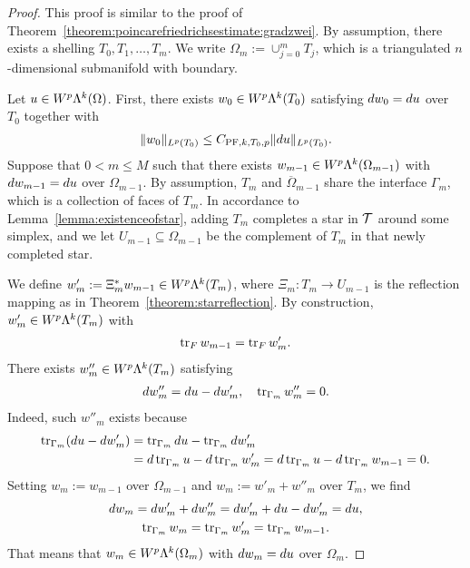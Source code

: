 \documentclass[10pt,letterpaper]{article}
\begin{document}
\begin{proof}
    This proof is similar to the proof of Theorem~\ref{theorem:poincarefriedrichsestimate:gradzwei}.
    By assumption, there exists a shelling $T_0, T_1, \dots, T_m$. 
    We write $\Omega_m := \cup_{j=0}^{m} T_j$, which is a triangulated $n$-dimensional submanifold with boundary.

    Let $u \in W^{p}\Lambda^{k}(\Omega)$. 
    First, there exists $w_0 \in W^{p}\Lambda^{k}(T_{0})$ satisfying $d w_0 = d u$ over $T_{0}$ together with 
    \begin{gather*}
        \| w_0 \|_{L^{p}(T_{0})} \leq C_{{\rm{PF}},k,T_{0},p} \| d u \|_{L^{p}(T_{0})}.
    \end{gather*}
    Suppose that $0 < m \leq M$ such that there exists $w_{m-1} \in W^{p}\Lambda^{k}(\Omega_{m-1})$ 
    with $d w_{m-1} = d u$ over $\Omega_{m-1}$. 
    By assumption, $T_{m}$ and $\overline\Omega_{m-1}$ share the interface $\Gamma_{m}$, which is a collection of faces of $T_{m}$. 
    In accordance to Lemma~\ref{lemma:existenceofstar}, adding $T_{m}$ completes a star in ${\mathcal T}$ around some simplex, and we let $U_{m-1} \subseteq \Omega_{m-1}$ be the complement of $T_{m}$ in that newly completed star. 
    
    We define $w'_{m} :=  \Xi_{m}^{\ast} w_{m-1} \in W^{p}\Lambda^{k}(T_{m})$,
    where $\Xi_{m} : T_{m} \rightarrow U_{m-1}$ is the reflection mapping
    as in Theorem~\ref{theorem:starreflection}. 
    By construction, $w'_{m} \in W^{p}\Lambda^{k}(T_{m})$ with 
    \begin{align*}
        \operatorname{tr}_F w_{m-1} = \operatorname{tr}_F w'_{m}
        . 
    \end{align*}
    There exists $w''_{m} \in W^{p}\Lambda^{k}(T_{m})$ satisfying 
    \begin{align*}
        d w''_{m} = d u - d w'_{m}, 
        \quad 
        \operatorname{tr}_{\Gamma_{m}} w''_{m} = 0.
    \end{align*}
    Indeed, such $w''_{m}$ exists because 
    \begin{align*}
        \operatorname{tr}_{\Gamma_{m}}( d u - d w'_{m} ) 
        &= 
        \operatorname{tr}_{\Gamma_{m}} d u - \operatorname{tr}_{\Gamma_{m}} d w'_{m}
        \\&= 
        d \operatorname{tr}_{\Gamma_{m}} u - d \operatorname{tr}_{\Gamma_{m}} w'_{m}
        = 
        d \operatorname{tr}_{\Gamma_{m}} u - d \operatorname{tr}_{\Gamma_{m}} w_{m-1}
        = 
        0
        .
    \end{align*}
    Setting $w_{m} := w_{m-1}$ over $\Omega_{m-1}$ and $w_{m} := w'_{m} + w''_{m}$ over $T_{m}$, 
    we find 
    \begin{gather*}
        d w_{m} = d w'_{m} + d w''_{m} = d w'_{m} + d u - d w'_{m} = d u,
        \\
        \operatorname{tr}_{\Gamma_{m}} w_{m} = \operatorname{tr}_{\Gamma_{m}} w'_{m} = \operatorname{tr}_{\Gamma_{m}} w_{m-1}.
    \end{gather*}
    That means that $w_{m} \in W^{p}\Lambda^{k}(\Omega_{m})$ with $d w_{m} = d u$ over $\Omega_{m}$. 
    

\end{proof}
\end{document}
